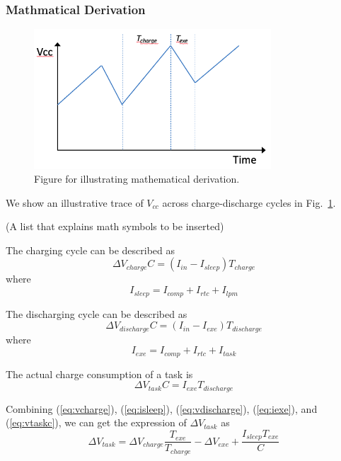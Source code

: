 \subsubsection{Mathmatical Derivation}

\begin{figure}[!t]
    \centering
    \includegraphics[width=3.49in]{ch5_repta/figures/math.jpg}
    \caption{Figure for illustrating mathematical derivation. }
    \label{fig:math}
\end{figure}

We show an illustrative trace of $V_{cc}$ across charge-discharge cycles in Fig.~\ref{fig:math}. 

(A list that explains math symbols to be inserted)

The charging cycle can be described as
\begin{equation}
    \Delta V_{charge} C = (I_{in} - I_{sleep}) T_{charge}
    \label{eq:vcharge} 
\end{equation}
where 
\begin{equation}
    I_{sleep} = I_{comp} + I_{rtc} + I_{lpm}
    \label{eq:isleep} 
\end{equation}

The discharging cycle can be described as
\begin{equation}
    \Delta V_{discharge} C = (I_{in} - I_{exe}) T_{discharge}
    \label{eq:vdischarge} 
\end{equation}
where
\begin{equation}
    I_{exe} = I_{comp} + I_{rtc} + I_{task}
    \label{eq:iexe} 
\end{equation}

The actual charge consumption of a task is
\begin{equation}
    \Delta V_{task} C = I_{exe} T_{discharge}
    \label{eq:vtaskc} 
\end{equation}

Combining (\ref{eq:vcharge}), (\ref{eq:isleep}), (\ref{eq:vdischarge}), (\ref{eq:iexe}), and (\ref{eq:vtaskc}), we can get the expression of $\Delta V_{task}$ as
\begin{equation}
    \Delta V_{task} = \Delta V_{charge} \frac{T_{exe}}{T_{charge}} - \Delta V_{exe} + \frac{I_{sleep}T_{exe}}{C}
    \label{eq:vtask} 
\end{equation}


